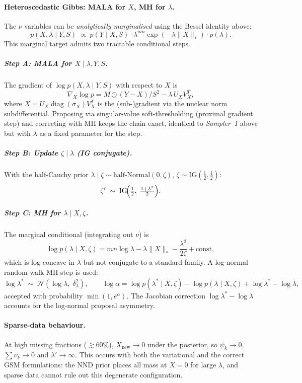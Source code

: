 \documentclass[11pt]{article}
\begin{document}
\paragraph{Heteroscedastic Gibbs: MALA for $X$, MH for $\lambda$.}
The $\nu$ variables can be \emph{analytically marginalised} using the Bessel
identity above:
\[
  p(X,\lambda\mid Y,S)
  \;\propto\;
  p(Y\mid X,S)\cdot\lambda^{mn}\exp(-\lambda\|X\|_*)\cdot p(\lambda).
\]
This marginal target admits two tractable conditional steps.

\subparagraph{Step A: MALA for $X\mid\lambda,Y,S$.}
The gradient of $\log p(X,\lambda\mid Y,S)$ with respect to $X$ is
\[
  \nabla_X\log p
  = M\odot(Y-X)/S^2 - \lambda\, U_X V_X^T,
\]
where $X=U_X\operatorname{diag}(\sigma_X)V_X^T$ is the (sub-)gradient via the nuclear norm
subdifferential.  Proposing via singular-value soft-thresholding (proximal
gradient step) and correcting with MH keeps the chain exact, identical to
\emph{Sampler~1} above but with $\lambda$ as a fixed parameter for the step.

\subparagraph{Step B: Update $\zeta\mid\lambda$ (IG conjugate).}
With the half-Cauchy prior $\lambda\mid\zeta\sim\mathrm{half\text{-}Normal}(0,\zeta)$,
$\zeta\sim\mathrm{IG}(\tfrac{1}{2},\tfrac{1}{2})$:
\[
  \zeta'\;\sim\;\mathrm{IG}\!\Bigl(\tfrac{1}{2},\;\tfrac{1+\lambda^2}{2}\Bigr).
\]

\subparagraph{Step C: MH for $\lambda\mid X,\zeta$.}
The marginal conditional (integrating out $\nu$) is
\[
  \log p(\lambda\mid X,\zeta)
  = mn\log\lambda - \lambda\|X\|_* - \frac{\lambda^2}{2\zeta} + \mathrm{const},
\]
which is log-concave in $\lambda$ but not conjugate to a standard family.
A log-normal random-walk MH step is used:
\[
  \log\lambda^* \;\sim\;\mathcal{N}(\log\lambda,\;\delta_\lambda^2),
  \qquad
  \log\alpha = \log p(\lambda^*\mid X,\zeta) - \log p(\lambda\mid X,\zeta)
  + \log\lambda^* - \log\lambda,
\]
accepted with probability $\min(1,e^\alpha)$.  The Jacobian correction
$\log\lambda^* - \log\lambda$ accounts for the log-normal proposal asymmetry.

\paragraph{Sparse-data behaviour.}
At high missing fractions ($\gtrsim$60\%), $X_\mathrm{new}\to 0$ under the
posterior, so $\psi_k\to 0$, $\sum\nu_k\to 0$ and $\lambda'\to\infty$.
This occurs with both the variational and the correct GSM formulations:
the NND prior places all mass at $X=0$ for large $\lambda$, and sparse
data cannot rule out this degenerate configuration.
\end{document}
